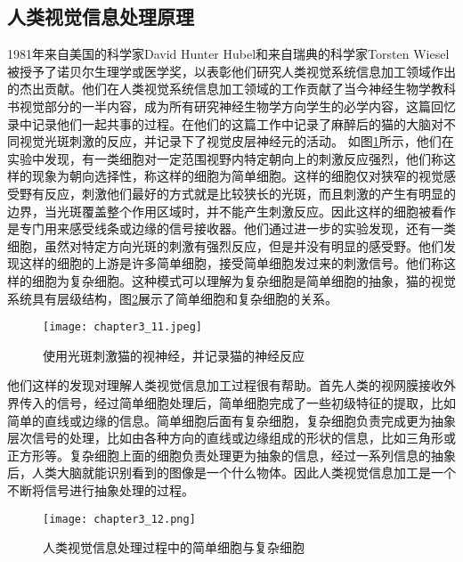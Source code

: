 \subsection{人类视觉信息处理原理}
1981年来自美国的科学家David Hunter Hubel和来自瑞典的科学家Torsten Wiesel被授予了诺贝尔生理学或医学奖，以表彰他们研究人类视觉系统信息加工领域作出的杰出贡献。他们在人类视觉系统信息加工领域的工作贡献了当今神经生物学教科书视觉部分的一半内容，成为所有研究神经生物学方向学生的必学内容，这篇回忆录\cite{Hubel1998EarlyEO}中记录他们一起共事的过程。在他们的这篇工作\cite{https://doi.org/10.1113/jphysiol.1959.sp006308}中记录了麻醉后的猫的大脑对不同视觉光斑刺激的反应，并记录下了视觉皮层神经元的活动。
如图\ref{fig:chapter3_11}所示，他们在实验中发现，有一类细胞对一定范围视野内特定朝向上的刺激反应强烈，他们称这样的现象为朝向选择性，称这样的细胞为简单细胞。这样的细胞仅对狭窄的视觉感受野有反应，刺激他们最好的方式就是比较狭长的光斑，而且刺激的产生有明显的边界，当光斑覆盖整个作用区域时，并不能产生刺激反应。因此这样的细胞被看作是专门用来感受线条或边缘的信号接收器。他们通过进一步的实验发现，还有一类细胞，虽然对特定方向光斑的刺激有强烈反应，但是并没有明显的感受野。他们发现这样的细胞的上游是许多简单细胞，接受简单细胞发过来的刺激信号。他们称这样的细胞为复杂细胞。这种模式可以理解为复杂细胞是简单细胞的抽象，猫的视觉系统具有层级结构，图\ref{fig:chapter3_12}展示了简单细胞和复杂细胞的关系。
\begin{figure}
    \centering
    \texttt{[image: chapter3\_11.jpeg]}
    \caption{使用光斑刺激猫的视神经，并记录猫的神经反应\cite{yanjianweishi}}
    \label{fig:chapter3_11}
\end{figure}
他们这样的发现对理解人类视觉信息加工过程很有帮助。首先人类的视网膜接收外界传入的信号，经过简单细胞处理后，简单细胞完成了一些初级特征的提取，比如简单的直线或边缘的信息。简单细胞后面有复杂细胞，复杂细胞负责完成更为抽象层次信号的处理，比如由各种方向的直线或边缘组成的形状的信息，比如三角形或正方形等。复杂细胞上面的细胞负责处理更为抽象的信息，经过一系列信息的抽象后，人类大脑就能识别看到的图像是一个什么物体。因此人类视觉信息加工是一个不断将信号进行抽象处理的过程。
\begin{figure}
    \centering
    \texttt{[image: chapter3\_12.png]}
    \caption{人类视觉信息处理过程中的简单细胞与复杂细胞\cite{yanjianweishi}}
    \label{fig:chapter3_12}
\end{figure}

